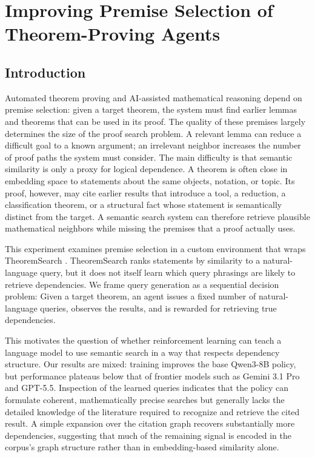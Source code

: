 \section{Improving Premise Selection of Theorem-Proving Agents}
\subsection{Introduction}
Automated theorem proving and AI-assisted mathematical reasoning depend on premise selection: given a target theorem, the system must find earlier lemmas and theorems that can be used in its proof. The quality of these premises largely determines the size of the proof search problem. A relevant lemma can reduce a difficult goal to a known argument; an irrelevant neighbor increases the number of proof paths the system must consider. The main difficulty is that semantic similarity is only a proxy for logical dependence. A theorem is often close in embedding space to statements about the same objects, notation, or topic. Its proof, however, may cite earlier results that introduce a tool, a reduction, a classification theorem, or a structural fact whose statement is semantically distinct from the target. A semantic search system can therefore retrieve plausible mathematical neighbors while missing the premises that a proof actually uses.

This experiment examines premise selection in a custom environment that wraps TheoremSearch \cite{theoremsearch2026}. TheoremSearch ranks statements by similarity to a natural-language query, but it does not itself learn which query phrasings are likely to retrieve dependencies. We frame query generation as a sequential decision problem: Given a target theorem, an agent issues a fixed number of natural-language queries, observes the results, and is rewarded for retrieving true dependencies.

This motivates the question of whether reinforcement learning can teach a language model to use semantic search in a way that respects dependency structure. Our results are mixed: training improves the base Qwen3-8B policy, but performance plateaus below that of frontier models such as Gemini 3.1 Pro and GPT-5.5. Inspection of the learned queries indicates that the policy can formulate coherent, mathematically precise searches but generally lacks the detailed knowledge of the literature required to recognize and retrieve the cited result. A simple expansion over the citation graph recovers substantially more dependencies, suggesting that much of the remaining signal is encoded in the corpus’s graph structure rather than in embedding-based similarity alone.

